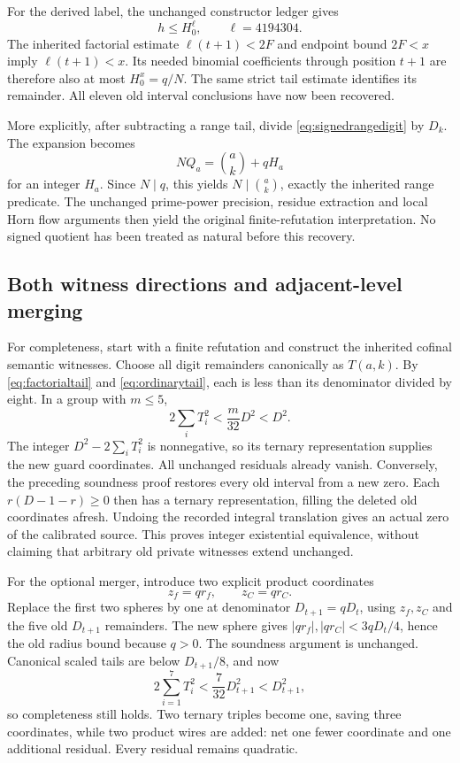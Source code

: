 For the derived label, the unchanged constructor ledger gives
\[
 h\le H_0^\ell,\qquad \ell=4194304.
\]
The inherited factorial estimate $\ell(t+1)<2F$ and endpoint bound
$2F<x$ imply $\ell(t+1)<x$. Its needed binomial coefficients through
position $t+1$ are therefore also at most $H_0^x=q/N$.
The same strict tail estimate identifies its remainder. All eleven old
interval conclusions have now been recovered.

More explicitly, after subtracting a range tail, divide
\eqref{eq:signedrangedigit} by $D_k$. The expansion becomes
\[
 NQ_a=\binom ak+qH_a
\]
for an integer $H_a$. Since $N\mid q$, this yields
$N\mid\binom ak$, exactly the inherited range predicate.
The unchanged prime-power precision, residue extraction and local Horn
flow arguments then yield the original finite-refutation interpretation.
No signed quotient has been treated as natural before this recovery.

\subsection{Both witness directions and adjacent-level merging}
For completeness, start with a finite refutation and construct the inherited
cofinal semantic witnesses. Choose all digit remainders canonically as
$T(a,k)$. By \eqref{eq:factorialtail} and \eqref{eq:ordinarytail}, each is
less than its denominator divided by eight. In a group with $m\le5$,
\[
 2\sum_iT_i^2<\frac{m}{32}D^2<D^2.
\]
The integer $D^2-2\sum_iT_i^2$ is nonnegative, so its ternary representation
supplies the new guard coordinates. All unchanged residuals already vanish.
Conversely, the preceding soundness proof restores every old interval from
a new zero. Each $r(D-1-r)\ge0$ then has a ternary representation, filling
the deleted old coordinates afresh. Undoing the recorded integral
translation gives an actual zero of the calibrated source. This proves
integer existential equivalence, without claiming that arbitrary old
private witnesses extend unchanged.

For the optional merger, introduce two explicit product coordinates
\[
 z_f=qr_f,\qquad z_C=qr_C.
\]
Replace the first two spheres by one at denominator $D_{t+1}=qD_t$,
using $z_f,z_C$ and the five old $D_{t+1}$ remainders. The new sphere gives
$|qr_f|,|qr_C|<3qD_t/4$, hence the old radius bound because $q>0$.
The soundness argument is unchanged. Canonical scaled tails are below
$D_{t+1}/8$, and now
\[
 2\sum_{i=1}^{7}T_i^2<\frac7{32}D_{t+1}^2<D_{t+1}^2,
\]
so completeness still holds. Two ternary triples become one, saving three
coordinates, while two product wires are added: net one fewer coordinate
and one additional residual. Every residual remains quadratic.

